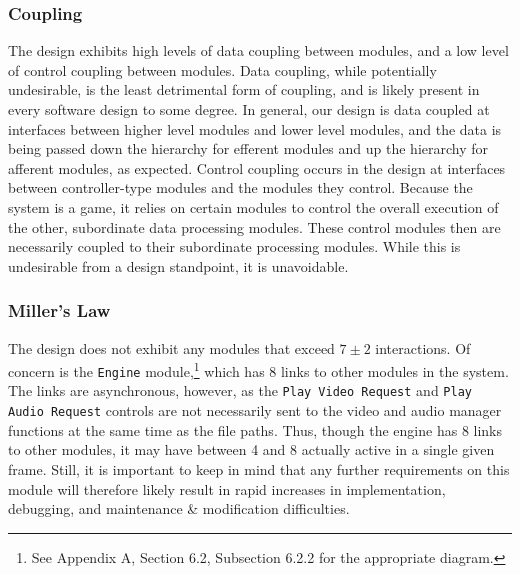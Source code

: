 \documentclass{article}
\begin{document}
		\subsubsection{Coupling}
			The design exhibits high levels of data coupling between modules, and a low level of control coupling between modules. Data coupling, while potentially undesirable, is the least detrimental form of coupling, and is likely present in every software design to some degree. In general, our design is data coupled at interfaces between higher level modules and lower level modules, and the data is being passed down the hierarchy for efferent modules and up the hierarchy for afferent modules, as expected. Control coupling occurs in the design at interfaces between controller-type modules and the modules they control. Because the system is a game, it relies on certain modules to control the overall execution of the other, subordinate data processing modules. These control modules then are necessarily coupled to their subordinate processing modules. While this is undesirable from a design standpoint, it is unavoidable. 
		\subsubsection{Miller's Law}
			The design does not exhibit any modules that exceed $7\pm2$ interactions. Of concern is the \texttt{Engine} module,\footnote{See Appendix A, Section 6.2, Subsection 6.2.2 for the appropriate diagram.} which has 8 links to other modules in the system. The links are asynchronous, however, as the \texttt{Play Video Request} and \texttt{Play Audio Request} controls are not necessarily sent to the video and audio manager functions at the same time as the file paths. Thus, though the engine has 8 links to other modules, it may have between 4 and 8 actually active in a single given frame. Still, it is important to keep in mind that any further requirements on this module will therefore likely result in rapid increases in implementation, debugging, and maintenance \& modification difficulties. 
			
\end{document}
